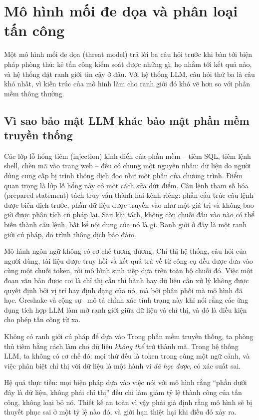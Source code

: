 
\section{Mô hình mối đe dọa và phân loại tấn công}
\label{sec:security_threat_model}

Một mô hình mối đe dọa (threat model) trả lời ba câu hỏi trước khi bàn tới biện pháp phòng thủ: kẻ tấn công kiểm soát được những gì, họ nhắm tới kết quả nào, và hệ thống đặt ranh giới tin cậy ở đâu. Với hệ thống LLM, câu hỏi thứ ba là câu khó nhất, vì kiến trúc của mô hình làm cho ranh giới đó khó vẽ hơn so với phần mềm thông thường.

\subsection{Vì sao bảo mật LLM khác bảo mật phần mềm truyền thống}
\label{ssec:security_why_different}

Các lớp lỗ hổng tiêm (injection) kinh điển của phần mềm -- tiêm SQL, tiêm lệnh shell, chèn mã vào trang web -- đều có chung một nguyên nhân: dữ liệu do người dùng cung cấp bị trình thông dịch đọc như một phần của chương trình. Điểm quan trọng là lớp lỗ hổng này có một cách sửa dứt điểm. Câu lệnh tham số hóa (prepared statement) tách truy vấn thành hai kênh riêng: phần cấu trúc câu lệnh được biên dịch trước, phần dữ liệu được truyền vào như một giá trị và không bao giờ được phân tích cú pháp lại. Sau khi tách, không còn chuỗi đầu vào nào có thể biến thành câu lệnh, bất kể nội dung của nó là gì. Ranh giới ở đây là một ranh giới cú pháp, do trình thông dịch bảo đảm.

Mô hình ngôn ngữ không có cơ chế tương đương. Chỉ thị hệ thống, câu hỏi của người dùng, tài liệu được truy hồi và kết quả trả về từ công cụ đều được đưa vào cùng một chuỗi token, rồi mô hình sinh tiếp dựa trên toàn bộ chuỗi đó. Việc một đoạn văn bản được coi là chỉ thị cần thi hành hay dữ liệu cần xử lý không được quyết định bởi vị trí hay định dạng của nó, mà bởi phân phối mà mô hình đã học. Greshake và cộng sự~\cite{greshake2023indirect} mô tả chính xác tình trạng này khi nói rằng các ứng dụng tích hợp LLM làm mờ ranh giới giữa dữ liệu và chỉ thị, và đó là điều kiện cho phép tấn công từ xa.

\begin{keyidea}{Không có ranh giới cú pháp để dựa vào}
Trong phần mềm truyền thống, ta phòng thủ tiêm bằng cách làm cho dữ liệu \emph{không thể} trở thành mã. Trong hệ thống LLM, ta không có cơ chế đó: mọi thứ đều là token trong cùng một ngữ cảnh, và việc phân biệt chỉ thị với dữ liệu là một hành vi \emph{đã học được}, có xác suất sai.

Hệ quả thực tiễn: mọi biện pháp dựa vào việc nói với mô hình rằng ``phần dưới đây là dữ liệu, không phải chỉ thị'' đều chỉ làm giảm tỷ lệ thành công của tấn công, không loại bỏ nó. Thiết kế an toàn vì vậy phải giả định rằng mô hình sẽ bị thuyết phục sai ở một tỷ lệ nào đó, và giới hạn thiệt hại khi điều đó xảy ra.
\end{keyidea}

